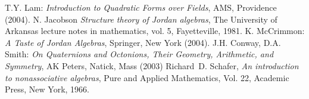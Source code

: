 \documentclass[12pt]{article}
\begin{document}
\begin{thebibliography}{7}
 T.Y. Lam: \emph{ Introduction to Quadratic Forms over Fields}, AMS, Providence (2004).
 N. Jacobson \emph{Structure theory of Jordan algebras}, The University of Arkansas lecture
notes in mathematics, vol. 5, Fayetteville, 1981.
 K. McCrimmon: \emph{ A Taste of Jordan Algebras}, Springer, New York (2004).
 J.H. Conway, D.A. Smith: \emph{ On Quaternions and Octonions, Their Geometry, Arithmetic, and Symmetry}, AK Peters, Natick, Mass (2003)
Richard~D. Schafer, \emph{An introduction to nonassociative algebras}, Pure and
  Applied Mathematics, Vol. 22, Academic Press, New York, 1966. 
\end{thebibliography}

\end{document}
